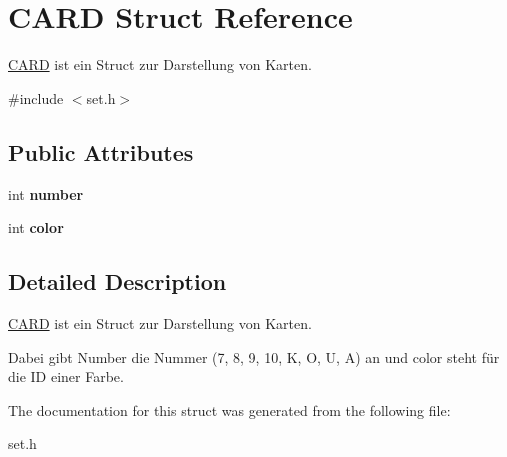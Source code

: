 \hypertarget{struct_c_a_r_d}{\section{C\-A\-R\-D Struct Reference}
\label{struct_c_a_r_d}
}


\hyperlink{struct_c_a_r_d}{C\-A\-R\-D} ist ein Struct zur Darstellung von Karten.  




{\ttfamily \#include $<$set.\-h$>$}

\subsection*{Public Attributes}
\begin{DoxyCompactItemize}
\item 
\hypertarget{struct_c_a_r_d_a36f0e6c29177b3e38a73a17c57d2f0ac}{int {\bfseries number}}\label{struct_c_a_r_d_a36f0e6c29177b3e38a73a17c57d2f0ac}

\item 
\hypertarget{struct_c_a_r_d_a931664b6380e876a72b664225ddfe20d}{int {\bfseries color}}\label{struct_c_a_r_d_a931664b6380e876a72b664225ddfe20d}

\end{DoxyCompactItemize}


\subsection{Detailed Description}
\hyperlink{struct_c_a_r_d}{C\-A\-R\-D} ist ein Struct zur Darstellung von Karten. 

Dabei gibt Number die Nummer (7, 8, 9, 10, K, O, U, A) an und color steht für die I\-D einer Farbe. 

The documentation for this struct was generated from the following file\-:\begin{DoxyCompactItemize}
\item 
set.\-h\end{DoxyCompactItemize}
